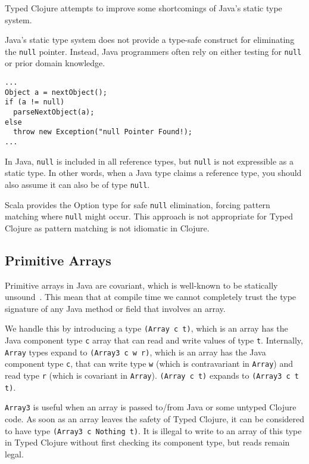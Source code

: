 Typed Clojure attempts to improve some shortcomings of Java's static type system.

Java's static type system does not provide a type-safe construct for eliminating
the \lstinline|null| pointer. Instead, Java programmers often rely on either testing
for \lstinline|null| or prior domain knowledge.

\begin{lstlisting}[caption=null elimination in Java]
...
Object a = nextObject();
if (a != null)
  parseNextObject(a);
else
  throw new Exception("null Pointer Found!);
...
\end{lstlisting}


In Java, \lstinline|null| is included in all reference
types, but \lstinline|null| is not expressible as a static type. In other words,
when a Java type claims a reference type, you should also assume it can also be of 
type \lstinline|null|.

Scala provides the Option type for safe \lstinline|null| elimination, forcing pattern matching
where \lstinline|null| might occur. This approach is not appropriate for Typed Clojure
as pattern matching is not idiomatic in Clojure.

\subsection{Primitive Arrays}
\label{designarrays}

Primitive arrays in Java are covariant, which is well-known to be statically unsound~\cite{OW97,BK99}.
This mean that at compile time we cannot completely trust the type signature of any Java method or field that involves 
an array.

We handle this by introducing a type \lstinline|(Array c t)|, which is an array has the Java component type \lstinline|c| 
array that can read and write values of type \lstinline|t|.
Internally, \lstinline|Array| types expand to \lstinline|(Array3 c w r)|,
which is an array has the Java component type \lstinline|c|,
that can write type \lstinline|w| (which is contravariant in \lstinline|Array|) and read type \lstinline|r| 
(which is covariant in \lstinline|Array|).
\lstinline|(Array c t)| expands to \lstinline|(Array3 c t t)|.

\lstinline|Array3| is useful when an array is passed to/from Java or some untyped Clojure code.
As soon as an array leaves the safety of Typed Clojure, it can be considered to have type
\lstinline|(Array3 c Nothing t)|. It is illegal to write to an array of this type in Typed Clojure
without first checking its component type, but reads remain legal.

